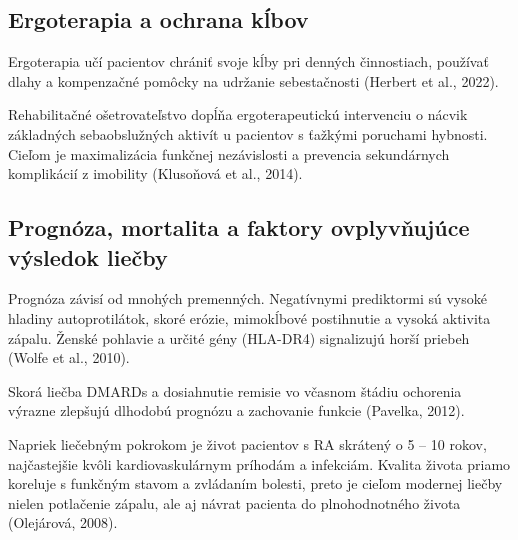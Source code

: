 \subsection{Ergoterapia a ochrana kĺbov}

Ergoterapia učí pacientov chrániť svoje kĺby pri denných činnostiach, používať dlahy a kompenzačné pomôcky na udržanie sebestačnosti (Herbert et al., 2022). 

Rehabilitačné ošetrovateľstvo dopĺňa ergoterapeutickú intervenciu o nácvik základných sebaobslužných aktivít u pacientov s ťažkými poruchami hybnosti. Cieľom je maximalizácia funkčnej nezávislosti a prevencia sekundárnych komplikácií z imobility (Klusoňová et al., 2014). 

\subsection{Prognóza, mortalita a faktory ovplyvňujúce výsledok liečby}

Prognóza závisí od mnohých premenných. Negatívnymi prediktormi sú vysoké hladiny autoprotilátok, skoré erózie, mimokĺbové postihnutie a vysoká aktivita zápalu. Ženské pohlavie a určité gény (HLA-DR4) signalizujú horší priebeh (Wolfe et al., 2010). 

Skorá liečba DMARDs a dosiahnutie remisie vo včasnom štádiu ochorenia výrazne zlepšujú dlhodobú prognózu a zachovanie funkcie (Pavelka, 2012). 

Napriek liečebným pokrokom je život pacientov s RA skrátený o 5 – 10 rokov, najčastejšie kvôli kardiovaskulárnym príhodám a infekciám. Kvalita života priamo koreluje s funkčným stavom a zvládaním bolesti, preto je cieľom modernej liečby nielen potlačenie zápalu, ale aj návrat pacienta do plnohodnotného života (Olejárová, 2008). 

